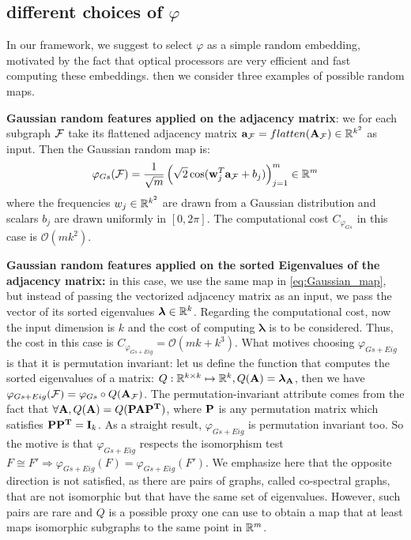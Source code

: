 \documentclass{article}
\begin{document}
\subsection{different choices of $\varphi$}
\label{sec:phi_choices}
In our framework, we suggest to select $\varphi$ as a simple random embedding, motivated by the fact that optical processors are very efficient and fast computing these embeddings.  then we consider three examples of possible random maps.

\textbf{Gaussian random features applied on the adjacency matrix}: we for each subgraph $\mathcal{F}$ take its flattened adjacency matrix  $\mathbf{a}_{\mathcal{F}}=flatten(\mathbf{A}_{\mathcal{F}}) \in\mathbb{R}^{k^2}$ as input. Then the Gaussian random map is:
\begin{equation}
\label{eq:Gaussian_map}
    \varphi_{Gs}(\mathcal{F}) = \frac{1}{\sqrt{m}} \left( \sqrt{2} \cos(\mathbf{w}_j^T\mathbf{a}_{\mathcal{F}}+b_j) \right)_{j=1}^m \in \mathbb{R}^m
\end{equation}
where the frequencies $w_j\in \mathbb{R}^{k^2}$ are drawn from a Gaussian distribution and scalars $b_j$ are drawn uniformly in $[0,2\pi]$. The computational cost $C_{\varphi_{Gs}}$ in this case is $\mathcal{O}(mk^2)$.

\textbf{Gaussian random features applied on the sorted Eigenvalues of the adjacency matrix:} in this case, we use the same map in \eqref{eq:Gaussian_map}, but instead of passing the vectorized adjacency matrix as an input, we pass the vector of its sorted eigenvalues $\bm{\lambda}\in\mathbb{R}^k$. Regarding the computational cost, now the input dimension is $k$ and the cost of computing  $\bm{\lambda}$ is to be considered. Thus, the cost in this case is $C_{\varphi_{Gs+Eig}}=\mathcal{O}(mk+k^3)$. What motives choosing $\varphi_{Gs+Eig}$ is that it is permutation invariant: let us define the function that computes the sorted eigenvalues of a matrix: $Q:\mathbb{R}^{k\times k}\mapsto\mathbb{R}^{k}, Q(\mathbf{A})=\bm{\lambda}_\mathbf{A}$, then we have  $\varphi_{Gs+Eig}(\mathcal{F})=\varphi_{Gs}\circ Q (\mathbf{A}_{\mathcal{F}})$. The permutation-invariant attribute comes from the fact that $\forall \mathbf{A}, Q(\mathbf{A}) = Q(\mathbf{PAP^T})$, where $\mathbf{P}$ is any permutation matrix which satisfies $\mathbf{PP^T}=\mathbf{I}_k$. As a straight result, $\varphi_{Gs+Eig}$ is permutation invariant too. So the motive is that  $\varphi_{Gs+Eig}$ respects the isomorphism test $F\cong F' \Rightarrow \varphi_{Gs+Eig}(F)=\varphi_{Gs+Eig}(F')$. We emphasize here that the opposite direction is not satisfied, as there are pairs of graphs, called co-spectral graphs, that are not isomorphic but that have the same set of eigenvalues. However, such pairs are rare and $Q$ is a possible proxy one can use to obtain a map that at least maps isomorphic subgraphs to the same point in $\mathbb{R}^m$.
\end{document}

